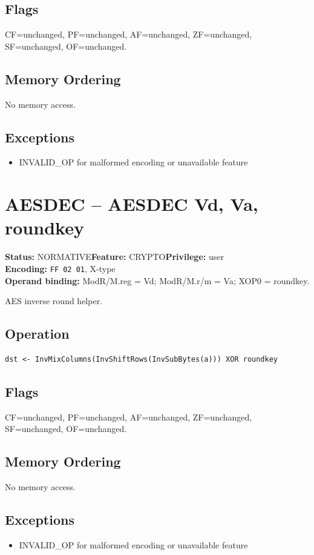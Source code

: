 \documentclass[10pt]{article}
\begin{document}
\subsection*{Flags}
CF=unchanged, PF=unchanged, AF=unchanged, ZF=unchanged, SF=unchanged, OF=unchanged.
\subsection*{Memory Ordering}
No memory access.
\subsection*{Exceptions}
\begin{itemize}
\item INVALID\_OP for malformed encoding or unavailable feature
\end{itemize}
\clearpage

\section{AESDEC -- AESDEC Vd, Va, roundkey}
\textbf{Status:} NORMATIVE\quad \textbf{Feature:} CRYPTO\quad \textbf{Privilege:} user\\
\textbf{Encoding:} \texttt{FF 02 01}, X-type\\
\textbf{Operand binding:} ModR/M.reg = Vd; ModR/M.r/m = Va; XOP0 = roundkey.

AES inverse round helper.

\subsection*{Operation}
\begin{lstlisting}
dst <- InvMixColumns(InvShiftRows(InvSubBytes(a))) XOR roundkey
\end{lstlisting}
\subsection*{Flags}
CF=unchanged, PF=unchanged, AF=unchanged, ZF=unchanged, SF=unchanged, OF=unchanged.
\subsection*{Memory Ordering}
No memory access.
\subsection*{Exceptions}
\begin{itemize}
\item INVALID\_OP for malformed encoding or unavailable feature
\end{itemize}
\clearpage
\end{document}

